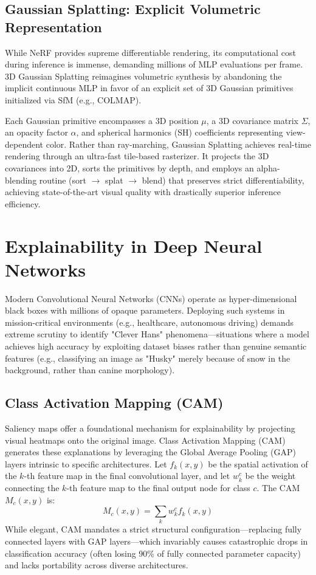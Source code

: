 \subsection{Gaussian Splatting: Explicit Volumetric Representation}
While NeRF provides supreme differentiable rendering, its computational cost during inference is immense, demanding millions of MLP evaluations per frame. 3D Gaussian Splatting reimagines volumetric synthesis by abandoning the implicit continuous MLP in favor of an explicit set of 3D Gaussian primitives initialized via SfM (e.g., COLMAP). 

Each Gaussian primitive encompasses a 3D position $\mu$, a 3D covariance matrix $\Sigma$, an opacity factor $\alpha$, and spherical harmonics (SH) coefficients representing view-dependent color. Rather than ray-marching, Gaussian Splatting achieves real-time rendering through an ultra-fast tile-based rasterizer. It projects the 3D covariances into 2D, sorts the primitives by depth, and employs an alpha-blending routine (sort $\to$ splat $\to$ blend) that preserves strict differentiability, achieving state-of-the-art visual quality with drastically superior inference efficiency.

\section{Explainability in Deep Neural Networks}

Modern Convolutional Neural Networks (CNNs) operate as hyper-dimensional black boxes with millions of opaque parameters. Deploying such systems in mission-critical environments (e.g., healthcare, autonomous driving) demands extreme scrutiny to identify "Clever Hans" phenomena---situations where a model achieves high accuracy by exploiting dataset biases rather than genuine semantic features (e.g., classifying an image as "Husky" merely because of snow in the background, rather than canine morphology).

\subsection{Class Activation Mapping (CAM)}
Saliency maps offer a foundational mechanism for explainability by projecting visual heatmaps onto the original image. Class Activation Mapping (CAM) generates these explanations by leveraging the Global Average Pooling (GAP) layers intrinsic to specific architectures. Let $f_k(x, y)$ be the spatial activation of the $k$-th feature map in the final convolutional layer, and let $w_k^c$ be the weight connecting the $k$-th feature map to the final output node for class $c$. The CAM $M_c(x, y)$ is:
\begin{equation}
M_c(x, y) = \sum_k w_k^c f_k(x, y)
\end{equation}
While elegant, CAM mandates a strict structural configuration---replacing fully connected layers with GAP layers---which invariably causes catastrophic drops in classification accuracy (often losing 90\% of fully connected parameter capacity) and lacks portability across diverse architectures.

